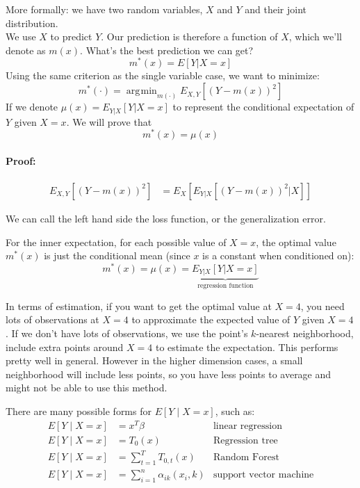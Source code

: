 \documentclass[12 pt]{article}
\DeclareMathOperator*{\argmin}{arg\!\min}
\begin{document}
More formally: we have two random variables, $X$ and $Y$ and their
joint distribution.
\\ We use $X$ to predict $Y$. Our prediction is therefore a function
of $X$, which we'll denote as $m(x)$. What's the best prediction we
can get?
$$m^*(x) = E[Y | X = x]$$
Using the same criterion as the single variable case, we want to
minimize:
$$m^*(\cdot) = \argmin_{m(\cdot)} E_{X,Y}[(Y-m(x))^2]$$
If we denote $\mu(x) = E_{Y|X}[Y|X = x]$ to represent the conditional
expectation of $Y$ given $X = x$. We will prove that
$$m^*(x) = \mu(x)$$
\paragraph{Proof:}
\begin{align*}
  E_{X,Y}[(Y-m(x))^2] & = E_{X}[E_{Y|X}[(Y-m(x))^2 | X]]
\end{align*}

We can call the left hand side the loss function, or the
generalization error.

For the inner expectation, for each possible value of $X = x$, the
optimal value $m^*(x)$ is just the conditional mean (since $x$ is a
constant when conditioned on):
$$m^*(x) = \mu(x) = \underbrace{E_{Y|X}[Y|X = x]}_{\text{regression function}}$$

In terms of estimation, if you want to get the optimal value at $X=4$,
you need lots of observations at $X=4$ to approximate the expected
value of $Y$ given $X = 4$. If we don't have lots of observations, we
use the point's $k$-nearest neighborhood, include extra points around $X =
4$ to estimate the expectation. This performs pretty well in
general. However in the higher dimension cases, a small neighborhood
will include less points, so you have less points to average and might
not be able to use this method.

There are many possible forms for $E[Y \mid X = x]$, such as:
\begin{align*}
  E[Y \mid X = x] & = x^T \beta & \text{linear regression}
  \\ E[Y \mid X = x] & = T_0(x) & \text{Regression tree}
  \\ E[Y \mid X = x] & = \sum_{t=1}^{T}T_{0,t}(x) & \text{Random Forest}
  \\ E[Y \mid X = x] & = \sum_{i=1}^n \alpha_{ik}(x_i, k) &
                                                            \text{support
                                                            vector machine}
\end{align*}
\end{document}
